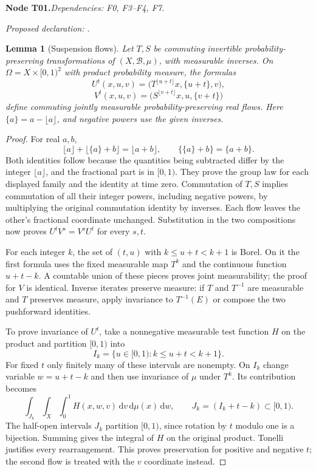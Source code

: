 \documentclass[11pt]{article}
\newtheorem{lemma}[theorem]{Lemma}
\theoremstyle{remark}\newtheorem{remark}[theorem]{Remark}
\newcommand{\dd}{\,\mathrm d}\newcommand{\tr}{\operatorname{tr}}
\newcommand{\bpnode}[3]{\par\Needspace{5\baselineskip}\noindent\textbf{Node #1.}\quad\textit{Dependencies: #2.}\par\noindent\textit{Proposed declaration:} \texttt{\detokenize{#3}}.\par\smallskip}
\begin{document}
\bpnode{T01}{F0, F3--F4, F7}{two_coordinate_suspension_flows}
\begin{lemma}[Suspension flows]\label{lem:suspension-flows}
Let $T,S$ be commuting invertible probability-preserving transformations of $(X,\mathcal B,\mu)$, with measurable inverses. On $\Omega=X\times[0,1)^2$ with product probability measure, the formulas
\[
 U^t(x,u,v)=\bigl(T^{\lfloor u+t\rfloor}x,\{u+t\},v\bigr),
\]
\[
 V^t(x,u,v)=\bigl(S^{\lfloor v+t\rfloor}x,u,\{v+t\}\bigr)
\]
define commuting jointly measurable probability-preserving real flows. Here $\{a\}=a-\lfloor a\rfloor$, and negative powers use the given inverses.
\end{lemma}
\begin{proof}
For real $a,b$,
\[
 \lfloor a\rfloor+\lfloor\{a\}+b\rfloor=\lfloor a+b\rfloor,
 \qquad \{\{a\}+b\}=\{a+b\}.
\]
Both identities follow because the quantities being subtracted differ by the integer $\lfloor a\rfloor$, and the fractional part is in $[0,1)$. They prove the group law for each displayed family and the identity at time zero. Commutation of $T,S$ implies commutation of all their integer powers, including negative powers, by multiplying the original commutation identity by inverses. Each flow leaves the other's fractional coordinate unchanged. Substitution in the two compositions now proves $U^tV^s=V^sU^t$ for every $s,t$.

For each integer $k$, the set of $(t,u)$ with $k\le u+t<k+1$ is Borel. On it the first formula uses the fixed measurable map $T^k$ and the continuous function $u+t-k$. A countable union of these pieces proves joint measurability; the proof for $V$ is identical. Inverse iterates preserve measure: if $T$ and $T^{-1}$ are measurable and $T$ preserves measure, apply invariance to $T^{-1}(E)$ or compose the two pushforward identities.

To prove invariance of $U^t$, take a nonnegative measurable test function $H$ on the product and partition $[0,1)$ into
\[
 I_k=\{u\in[0,1):k\le u+t<k+1\}.
\]
For fixed $t$ only finitely many of these intervals are nonempty. On $I_k$ change variable $w=u+t-k$ and then use invariance of $\mu$ under $T^k$. Its contribution becomes
\[
 \int_{J_k}\int_X\int_0^1 H(x,w,v)\dd v\dd\mu(x)\dd w,
 \qquad J_k=(I_k+t-k)\subset[0,1).
\]
The half-open intervals $J_k$ partition $[0,1)$, since rotation by $t$ modulo one is a bijection. Summing gives the integral of $H$ on the original product. Tonelli justifies every rearrangement. This proves preservation for positive and negative $t$; the second flow is treated with the $v$ coordinate instead.
\end{proof}
\end{document}
